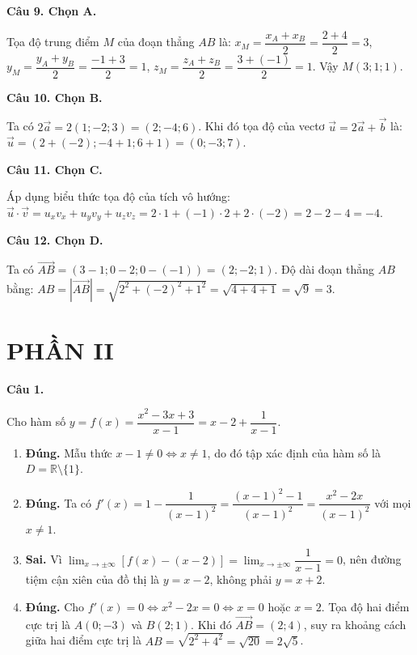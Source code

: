 \documentclass[12pt,a4paper]{article}
\newcommand{\loigiai}[1]{\par\medskip\Needspace{4\baselineskip}\noindent\textbf{#1}\par\nobreak}
\begin{document}
\loigiai{Câu 9. Chọn A.}
Tọa độ trung điểm $M$ của đoạn thẳng $AB$ là:
$x_M = \dfrac{x_A+x_B}{2} = \dfrac{2+4}{2} = 3$,
$y_M = \dfrac{y_A+y_B}{2} = \dfrac{-1+3}{2} = 1$,
$z_M = \dfrac{z_A+z_B}{2} = \dfrac{3+(-1)}{2} = 1$.
Vậy $M(3;1;1)$.

\loigiai{Câu 10. Chọn B.}
Ta có $2\vec{a} = 2(1;-2;3) = (2;-4;6)$.
Khi đó tọa độ của vectơ $\vec{u} = 2\vec{a} + \vec{b}$ là:
$\vec{u} = (2 + (-2); -4 + 1; 6 + 1) = (0;-3;7)$.

\loigiai{Câu 11. Chọn C.}
Áp dụng biểu thức tọa độ của tích vô hướng:
$\vec{u}\cdot\vec{v} = u_x v_x + u_y v_y + u_z v_z = 2\cdot 1 + (-1)\cdot 2 + 2\cdot(-2) = 2 - 2 - 4 = -4$.

\loigiai{Câu 12. Chọn D.}
Ta có $\vec{AB} = (3-1; 0-2; 0-(-1)) = (2;-2;1)$.
Độ dài đoạn thẳng $AB$ bằng:
$AB = |\vec{AB}| = \sqrt{2^2 + (-2)^2 + 1^2} = \sqrt{4+4+1} = \sqrt{9} = 3$.

\section*{PHẦN II}

\loigiai{Câu 1.}
Cho hàm số $y=f(x)=\dfrac{x^2-3x+3}{x-1} = x - 2 + \dfrac{1}{x-1}$.
\begin{enumerate}
\item \textbf{Đúng.} Mẫu thức $x-1\ne 0 \iff x\ne 1$, do đó tập xác định của hàm số là $D=\mathbb{R}\setminus\{1\}$.
\item \textbf{Đúng.} Ta có $f'(x) = 1 - \dfrac{1}{(x-1)^2} = \dfrac{(x-1)^2-1}{(x-1)^2} = \dfrac{x^2-2x}{(x-1)^2}$ với mọi $x\ne 1$.
\item \textbf{Sai.} Vì $\lim_{x\to\pm\infty}[f(x)-(x-2)] = \lim_{x\to\pm\infty}\dfrac{1}{x-1} = 0$, nên đường tiệm cận xiên của đồ thị là $y=x-2$, không phải $y=x+2$.
\item \textbf{Đúng.} Cho $f'(x)=0 \iff x^2-2x=0 \iff x=0$ hoặc $x=2$.
Tọa độ hai điểm cực trị là $A(0;-3)$ và $B(2;1)$.
Khi đó $\vec{AB}=(2;4)$, suy ra khoảng cách giữa hai điểm cực trị là $AB = \sqrt{2^2+4^2} = \sqrt{20} = 2\sqrt{5}$.
\end{enumerate}
\end{document}
